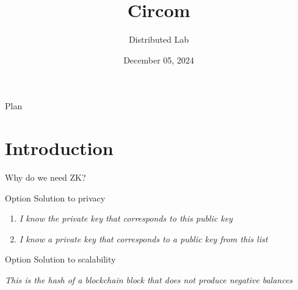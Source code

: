 \documentclass{zkdl-presentation-template}
\title[Circom]{\textbf{Circom}}
\author{Distributed Lab}
\date{December 05, 2024}
\begin{document}

    \begin{frame}{Plan}
        \tableofcontents
    \end{frame}


    \section{Introduction}

    \begin{frame}{Why do we need ZK?}
        \pause

        \begin{block}{Option}
            Solution to privacy
        \end{block}

        \pause

        \begin{example}
            \begin{enumerate}
                \item \textit{I know the private key that corresponds to this public key}
                \item \textit{I know a private key that corresponds to a public key from this list}
            \end{enumerate}
        \end{example}

        \pause

        \begin{block}{Option}
            Solution to scalability
        \end{block}

        \pause

        \begin{example}
            \textit{This is the hash of a blockchain block that does not produce negative balances}
        \end{example}
    \end{frame}
\end{document}
